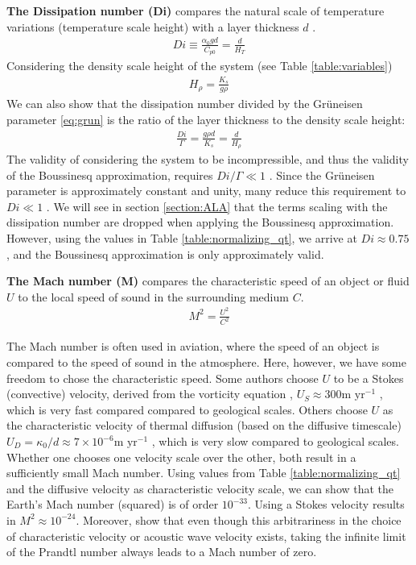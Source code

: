 \documentclass[a4paper]{article}
\begin{document}
\textbf{The Dissipation number (Di)} compares the natural scale of temperature variations (temperature scale height) with a layer thickness $d$ \autocite{rica07}. 
\begin{align*}
    \mathit{Di} \equiv \frac{\alpha_0 g d}{C_{p0}} = \frac{d}{H_T}
\end{align*}
Considering the density scale height of the system \autocite{scto01} (see Table \ref{table:variables})
\begin{align*}
    H_\rho = \frac{K_s}{g\rho}
\end{align*}
We can also show that the dissipation number divided by the Grüneisen parameter \eqref{eq:grun} is the ratio of the layer thickness to the density scale height: 
\begin{align*}
    \frac{\mathit{Di}}{\Gamma} = \frac{g\rho d}{K_s} = \frac{d}{H_\rho}
\end{align*}
The validity of considering the system to be incompressible, and thus the validity of the Boussinesq approximation, requires $\mathit{Di}/\Gamma \ll 1$ \autocite{scto01}.
Since the Grüneisen parameter is approximately constant and unity, many reduce this requirement to $\mathit{Di} \ll 1$ \autocite{jamc80,rica07}. We will see in section \ref{section:ALA} that
the terms scaling with the dissipation number are dropped when applying the Boussinesq approximation.
However, using the values in Table \ref{table:normalizing_qt}, we arrive at $\mathit{Di} \approx 0.75$, and the Boussinesq approximation is only approximately valid. 


\textbf{The Mach number (M)} compares the characteristic speed of an object or fluid $U$ to the local speed of sound in the surrounding medium $C$. 
\begin{align*}
    M^2 = \frac{U^2}{C^2}
\end{align*}

The Mach number is often used in aviation, where the speed of an object is 
compared to the speed of sound in the atmosphere. Here, however, we have some freedom to chose the characteristic speed. 
Some authors choose $U$ to be a Stokes (convective) velocity, derived from the vorticity equation \autocite{mcrw74}, $U_S \approx 300 \text{m yr}^{-1}$ \autocite{jamc80}, which is very fast compared compared to geological scales. Others choose $U$ 
as the characteristic velocity of thermal 
diffusion (based on the diffusive timescale) $U_D = \kappa_0/d \approx 7 \times 10^{-6} \text{m yr}^{-1}$ \autocite{rica07,scto01,itki94,lezh08}, which is very slow compared to geological scales. 
Whether one chooses one velocity scale over the other, both result in a sufficiently small Mach number. Using values from Table \ref{table:normalizing_qt} and the diffusive velocity as characteristic velocity scale,
we can show that the Earth's Mach number (squared) is of order $10^{-33}$. Using a Stokes velocity results in $M^2 \approx 10^{-24}$. 
Moreover, \textcite{cudu19} show that even though this arbitrariness in the choice of characteristic velocity or acoustic wave velocity exists, taking the infinite limit of the Prandtl number 
always leads to a Mach number of zero. 
\end{document}
